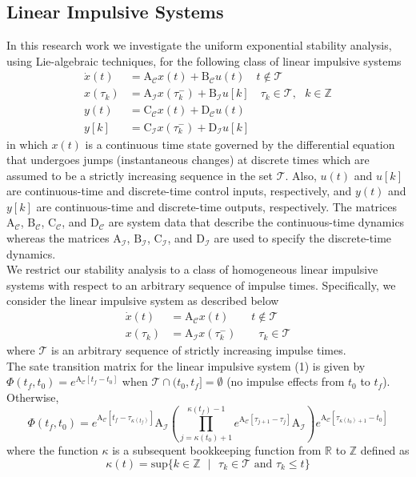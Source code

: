 \documentclass[11pt,a4paper]{article}
\begin{document}
\subsection{Linear Impulsive Systems}
	\qquad In this research work we investigate the uniform exponential stability analysis, using Lie-algebraic techniques, for the following class of linear impulsive systems
\begin{align*}
\dot{x}(t) &= \mathrm{A}_\mathcal{C}x(t) + \mathrm{B}_\mathcal{C}u(t) \quad t \notin \mathcal{T} \\
x(\tau_k) &= \mathrm{A}_\mathcal{I}x(\tau_k^{-}) + \mathrm{B}_\mathcal{I}u[k] \quad \tau_k \in \mathcal{T}, \text{ } k \in \mathbb{Z} \\
y(t) &= \mathrm{C}_\mathcal{C}x(t) + \mathrm{D}_\mathcal{C}u(t)  \\
y[k] &= \mathrm{C}_\mathcal{I}x(\tau^{-}_k) + \mathrm{D}_\mathcal{I}u[k]
\end{align*}
in which $x(t)$ is a continuous time state governed by the differential equation that undergoes jumps (instantaneous changes) at discrete times which are assumed to be a strictly increasing sequence in the set $\mathcal{T}$. Also, $u(t)$ and $u[k]$ are continuous-time and discrete-time control inputs, respectively, and $y(t)$ and $y[k]$ are continuous-time and discrete-time outputs, respectively. The matrices $\mathrm{A}_\mathcal{C}$, $\mathrm{B}_\mathcal{C}$, $\mathrm{C}_\mathcal{C}$, and $\mathrm{D}_\mathcal{C}$ are system data that describe the continuous-time dynamics whereas the matrices $\mathrm{A}_\mathcal{I}$, $\mathrm{B}_\mathcal{I}$, $\mathrm{C}_\mathcal{I}$, and $\mathrm{D}_\mathcal{I}$ are used to specify the discrete-time dynamics.\\
 
We restrict our stability analysis to a class of homogeneous linear impulsive systems with respect to an arbitrary sequence of impulse times. Specifically, we consider the linear impulsive system as described below
\begin{align}
\dot{x}(t) &= \mathrm{A}_\mathcal{C}x(t) \qquad t \notin \mathcal{T} \\
 x(\tau_k) &= \mathrm{A}_\mathcal{I}x(\tau_k^{-}) \qquad \tau_k \in \mathcal{T} \nonumber
\end{align}
where $\mathcal{T}$ is an arbitrary sequence of strictly increasing impulse times.\\

The sate transition matrix for the linear impulsive system (1) is given by $\Phi(t_f, t_0) = e^{\mathrm{A}_\mathcal{C}[t_f-t_0]}$ when $\mathcal{T}\cap(t_0,t_f] = \emptyset $ (no impulse effects from $t_0$ to $t_f$). Otherwise,
$$
\Phi(t_f, t_0) = e^{\mathrm{A}_\mathcal{C}[t_f-\tau_{\kappa(t_f)}]}\mathrm{A}_\mathcal{I}
\left( \prod^{\kappa(t_f)-1}_{j=\kappa(t_0)+1}e^{\mathrm{A}_\mathcal{C}[\tau_{j+1}-\tau_j]}\mathrm{A}_\mathcal{I} \right)
e^{\mathrm{A}_\mathcal{C}[\tau_{\kappa(t_0)+1}-t_0]}
$$
where the function $\kappa$ is a subsequent bookkeeping function from $\mathbb{R}$ to $\mathbb{Z}$ defined as
$$
\kappa(t) = \mathrm{sup}\{k \in \mathbb{Z} \text{ } \lvert \text{ } \tau_k \in \mathcal{T} \text{ and } \tau_k \leq t \}
$$
\end{document}
